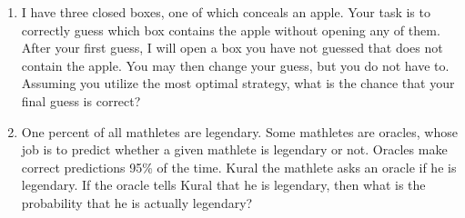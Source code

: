 \documentclass[11pt]{article}
\begin{document}
\begin{enumerate}[1.]
			\item I have three closed boxes, one of which conceals an apple. Your task is to correctly guess which box contains the apple without opening any of them. After your first guess, I will open a box you have not guessed that does not contain the apple. You may then change your guess, but you do not have to. Assuming you utilize the most optimal strategy, what is the chance that your final guess is correct?
			
			\item One percent of all mathletes are legendary. Some mathletes are oracles, whose job is to predict whether a given mathlete is legendary or not. Oracles make correct predictions 95\% of the time. Kural the mathlete asks an oracle if he is legendary. If the oracle tells Kural that he is legendary, then what is the probability that he is actually legendary?
		\end{enumerate}
\end{document}
